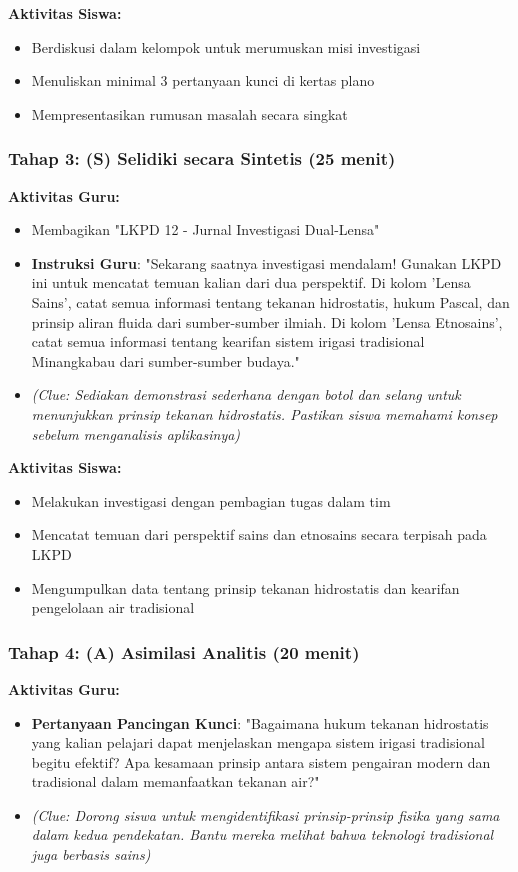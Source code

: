 \documentclass[12pt,a4paper]{article}
\begin{document}
\textbf{Aktivitas Siswa:}
\begin{itemize}
\item Berdiskusi dalam kelompok untuk merumuskan misi investigasi
\item Menuliskan minimal 3 pertanyaan kunci di kertas plano
\item Mempresentasikan rumusan masalah secara singkat
\end{itemize}

\subsubsection{Tahap 3: (S) Selidiki secara Sintetis (25 menit)}

\textbf{Aktivitas Guru:}
\begin{itemize}
\item Membagikan "LKPD 12 - Jurnal Investigasi Dual-Lensa"
\item \textbf{Instruksi Guru}: "Sekarang saatnya investigasi mendalam! Gunakan LKPD ini untuk mencatat temuan kalian dari dua perspektif. Di kolom 'Lensa Sains', catat semua informasi tentang tekanan hidrostatis, hukum Pascal, dan prinsip aliran fluida dari sumber-sumber ilmiah. Di kolom 'Lensa Etnosains', catat semua informasi tentang kearifan sistem irigasi tradisional Minangkabau dari sumber-sumber budaya."
\item \textit{(Clue: Sediakan demonstrasi sederhana dengan botol dan selang untuk menunjukkan prinsip tekanan hidrostatis. Pastikan siswa memahami konsep sebelum menganalisis aplikasinya)}
\end{itemize}

\textbf{Aktivitas Siswa:}
\begin{itemize}
\item Melakukan investigasi dengan pembagian tugas dalam tim
\item Mencatat temuan dari perspektif sains dan etnosains secara terpisah pada LKPD
\item Mengumpulkan data tentang prinsip tekanan hidrostatis dan kearifan pengelolaan air tradisional
\end{itemize}

\subsubsection{Tahap 4: (A) Asimilasi Analitis (20 menit)}

\textbf{Aktivitas Guru:}
\begin{itemize}
\item \textbf{Pertanyaan Pancingan Kunci}: "Bagaimana hukum tekanan hidrostatis yang kalian pelajari dapat menjelaskan mengapa sistem irigasi tradisional begitu efektif? Apa kesamaan prinsip antara sistem pengairan modern dan tradisional dalam memanfaatkan tekanan air?"
\item \textit{(Clue: Dorong siswa untuk mengidentifikasi prinsip-prinsip fisika yang sama dalam kedua pendekatan. Bantu mereka melihat bahwa teknologi tradisional juga berbasis sains)}
\end{itemize}
\end{document}
